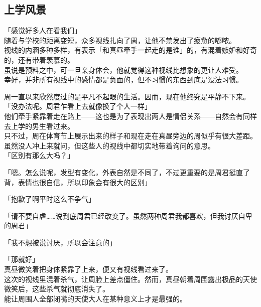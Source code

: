 \subsection{上学风景}

「感觉好多人在看我们」\\

随着与学校的距离变短，众多视线扎向了周，让他不禁发出了疲惫的嘟哝。\\

视线的内涵多种多样，有表示「和真昼牵手一起走的是谁」的，有混着嫉妒和好奇的，还有带着羡慕的。\\

虽说是预料之中，可一旦亲身体会，他就觉得这种视线比想象的更让人难受。\\

幸好，并非所有视线中的感情都是负面的，但不习惯的东西到底是没法习惯。

周一直以来欣然度过的是平凡不起眼的生活。因而，现在他终究是平静不下来。\\

「没办法呢。周君乍看上去就像换了个人一样」\\

他们牵手紧靠着走在路上——这也是为了表现出两人是情侣关系——自然会有同样去上学的男生看过来。\\

只不过，周在体育节上展示出来的样子和现在走在真昼旁边的周似乎有很大差距。虽然没人冲上来就问，但这些人的视线中都切实地带着询问的意思。\\

「区别有那么大吗？」

「嗯。怎么说呢，发型有变化，外表自然是不同了，不过更重要的是周君挺直了背，表情也很自信，所以印象会有很大的区别」

「抱歉了啊平时这么不争气」

「请不要自虐……说到底周君已经改变了。虽然两种周君我都喜欢，但我讨厌自卑的周君」

「我不想被说讨厌，所以会注意的」

「那就好」\\

真昼微笑着把身体紧靠了上来，便又有视线看过来了。\\

这次的视线里混着杀气，让周脸上差点僵住。然而，真昼朝着周围露出极品的天使微笑后，这些杀气就彻底消失了。\\

能让周围人全部闭嘴的天使大人在某种意义上才是最强的。\\

